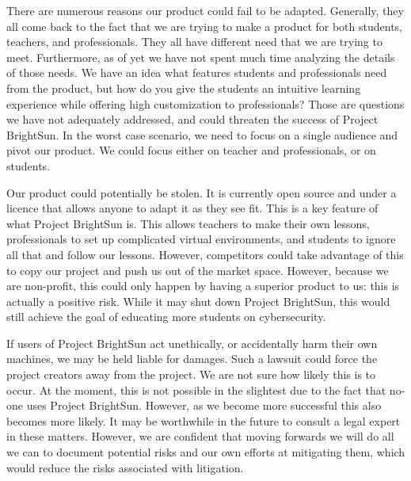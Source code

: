 \documentclass[openright]{report}
\begin{document}
\par There are numerous reasons our product could fail to be adapted. Generally, they all come back to the fact that we are trying to make a product for both students, teachers, and professionals. They all have different need that we are trying to meet. Furthermore, as of yet we have not spent much time analyzing the details of those needs. We have an idea what features students and professionals need from the product, but how do you give the students an intuitive learning experience while offering high customization to professionals? Those are questions we have not adequately addressed, and could threaten the success of Project BrightSun. In the worst case scenario, we need to focus on a single audience and pivot our product. We could focus either on teacher and professionals, or on students.

\par Our product could potentially be stolen. It is currently open source and under a licence that allows anyone to adapt it as they see fit. This is a key feature of what Project BrightSun is. This allows teachers to make their own lessons, professionals to set up complicated virtual environments, and students to ignore all that and follow our lessons. However, competitors could take advantage of this to copy our project and push us out of the market space. However, because we are non-profit, this could only happen by having a superior product to us: this is actually a positive risk. While it may shut down Project BrightSun, this would still achieve the goal of educating more students on cybersecurity.

\par If users of Project BrightSun act unethically, or accidentally harm their own machines, we may be held liable for damages. Such a lawsuit could force the project creators away from the project. We are not sure how likely this is to occur. At the moment, this is not possible in the slightest due to the fact that no-one uses Project BrightSun. However, as we become more successful this also becomes more likely. It may be worthwhile in the future to consult a legal expert in these matters. However, we are confident that moving forwards we will do all we can to document potential risks and our own efforts at mitigating them, which would reduce the risks associated with litigation.
\end{document}
